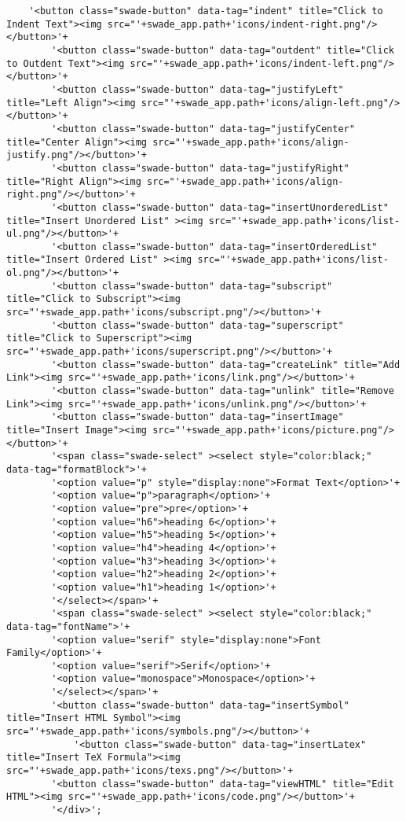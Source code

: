 \begin{lstlisting}
	'<button class="swade-button" data-tag="indent" title="Click to Indent Text"><img src="'+swade_app.path+'icons/indent-right.png"/></button>'+
	    '<button class="swade-button" data-tag="outdent" title="Click to Outdent Text"><img src="'+swade_app.path+'icons/indent-left.png"/></button>'+
	    '<button class="swade-button" data-tag="justifyLeft" title="Left Align"><img src="'+swade_app.path+'icons/align-left.png"/></button>'+
	    '<button class="swade-button" data-tag="justifyCenter" title="Center Align"><img src="'+swade_app.path+'icons/align-justify.png"/></button>'+
	    '<button class="swade-button" data-tag="justifyRight" title="Right Align"><img src="'+swade_app.path+'icons/align-right.png"/></button>'+
	    '<button class="swade-button" data-tag="insertUnorderedList" title="Insert Unordered List" ><img src="'+swade_app.path+'icons/list-ul.png"/></button>'+
	    '<button class="swade-button" data-tag="insertOrderedList" title="Insert Ordered List" ><img src="'+swade_app.path+'icons/list-ol.png"/></button>'+
	    '<button class="swade-button" data-tag="subscript" title="Click to Subscript"><img src="'+swade_app.path+'icons/subscript.png"/></button>'+
	    '<button class="swade-button" data-tag="superscript" title="Click to Superscript"><img src="'+swade_app.path+'icons/superscript.png"/></button>'+
	    '<button class="swade-button" data-tag="createLink" title="Add Link"><img src="'+swade_app.path+'icons/link.png"/></button>'+
	    '<button class="swade-button" data-tag="unlink" title="Remove Link"><img src="'+swade_app.path+'icons/unlink.png"/></button>'+
	    '<button class="swade-button" data-tag="insertImage" title="Insert Image"><img src="'+swade_app.path+'icons/picture.png"/></button>'+
	    '<span class="swade-select" ><select style="color:black;" data-tag="formatBlock">'+
	    '<option value="p" style="display:none">Format Text</option>'+
	    '<option value="p">paragraph</option>'+
	    '<option value="pre">pre</option>'+
	    '<option value="h6">heading 6</option>'+
	    '<option value="h5">heading 5</option>'+
	    '<option value="h4">heading 4</option>'+
	    '<option value="h3">heading 3</option>'+
	    '<option value="h2">heading 2</option>'+
	    '<option value="h1">heading 1</option>'+
	    '</select></span>'+
	    '<span class="swade-select" ><select style="color:black;" data-tag="fontName">'+
	    '<option value="serif" style="display:none">Font Family</option>'+
	    '<option value="serif">Serif</option>'+
	    '<option value="monospace">Monospace</option>'+
	    '</select></span>'+
	    '<button class="swade-button" data-tag="insertSymbol" title="Insert HTML Symbol"><img src="'+swade_app.path+'icons/symbols.png"/></button>'+
            '<button class="swade-button" data-tag="insertLatex" title="Insert TeX Formula"><img src="'+swade_app.path+'icons/texs.png"/></button>'+
	    '<button class="swade-button" data-tag="viewHTML" title="Edit HTML"><img src="'+swade_app.path+'icons/code.png"/></button>'+            
	    '</div>';


\end{lstlisting}
